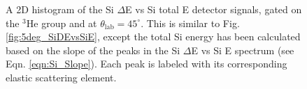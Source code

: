 \begin{figure}[!htb]
\caption{\label{fig:5deg_SiDEvsSiTotE}A 2D histogram of the Si $\Delta$E vs Si total E detector signals, gated on the $^{3}$He group and at $\theta_{\mathrm{lab}} = 45^{\circ}$. This is similar to Fig. \ref{fig:5deg_SiDEvsSiE}, except the total Si energy has been calculated based on the slope of the peaks in the Si $\Delta$E vs Si E spectrum (see Eqn. \ref{eqn:Si_Slope}). Each peak is labeled with its corresponding elastic scattering element.}
\end{figure}

